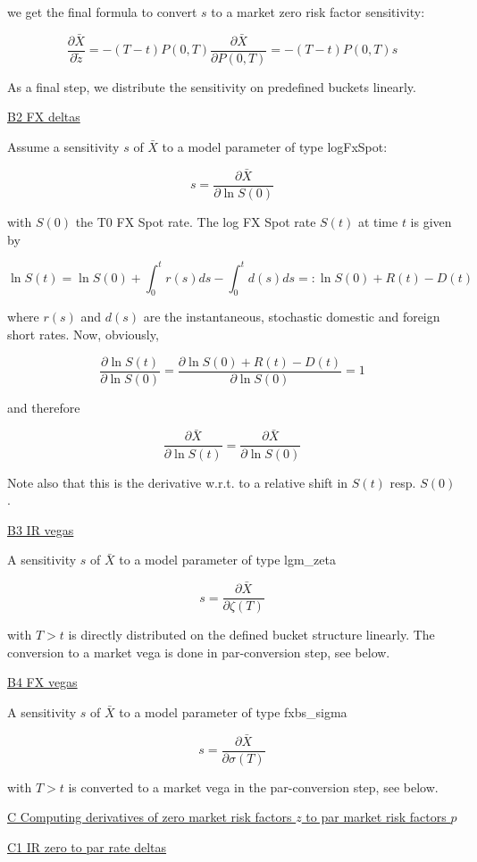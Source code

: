 we get the final formula to convert $s$ to a market zero risk factor sensitivity:

$$
\frac{\partial \bar{X}}{\partial{\tilde{z}}} = -(T-t) P(0,T) \frac{\partial \bar{X}}{\partial P(0,T)} = -(T-t) P(0,T) s
$$

As a final step, we distribute the sensitivity on predefined buckets linearly.

\underline{B2  FX deltas}

Assume a sensitivity $s$ of $\bar{X}$ to a model parameter of type logFxSpot:

$$
s = \frac{\partial\bar{X}}{\partial \ln S(0)}
$$

with $S(0)$ the T0 FX Spot rate. The log FX Spot rate $S(t)$ at time $t$ is given by

$$
\ln S(t) = \ln S(0) + \int_0^t r(s) ds - \int_0^t d(s) ds =: \ln S(0) + R(t) - D(t)
$$

where $r(s)$ and $d(s)$ are the instantaneous, stochastic domestic and foreign short rates. Now, obviously,

$$
\frac{\partial \ln S(t)}{\partial \ln S(0)} = \frac{\partial \ln S(0) + R(t) - D(t)}{\partial \ln S(0)} = 1
$$

and therefore

$$
\frac{\partial \bar{X}}{\partial \ln S(t)} = \frac{\partial \bar{X}}{\partial \ln S(0)}
$$

Note also that this is the derivative w.r.t. to a relative shift in $S(t)$ resp. $S(0)$.

\underline{B3  IR vegas}

A sensitivity $s$ of $\bar{X}$ to a model parameter of type lgm\_zeta

$$
s = \frac{\partial\bar{X}}{\partial \zeta(T)}
$$

with $T>t$ is directly distributed on the defined bucket structure linearly. The conversion to a market vega is done in
par-conversion step, see below.


\underline{B4  FX vegas}

A sensitivity $s$ of $\bar{X}$ to a model parameter of type fxbs\_sigma

$$
s = \frac{\partial\bar{X}}{\partial \sigma(T)}
$$

with $T>t$ is converted to a market vega in the par-conversion step, see below.


\underline{C Computing derivatives of zero market risk factors $z$ to par market risk factors $p$}

\underline{C1 IR zero to par rate deltas}

